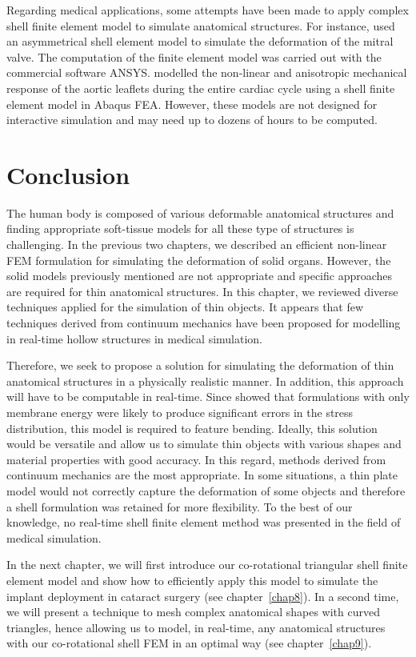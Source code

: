 Regarding medical applications, some attempts have been made to apply complex shell finite element model to simulate anatomical structures. For instance, \cite{Lim05} used an asymmetrical shell element model to simulate the deformation of the mitral valve. The computation of the finite element model was carried out with the commercial software ANSYS. \cite{Conti10} modelled the non-linear and anisotropic mechanical response of the aortic leaflets during the entire cardiac cycle using a shell finite element model in Abaqus FEA. However, these models are not designed for interactive simulation and may need up to dozens of hours to be computed. 


\section{Conclusion}

The human body is composed of various deformable anatomical structures and finding appropriate soft-tissue models for all these type of structures is challenging. In the previous two chapters, we described an efficient non-linear FEM formulation for simulating the deformation of solid organs. However, the solid models previously mentioned are not appropriate and specific approaches are required for thin anatomical structures. In this chapter, we reviewed diverse techniques applied for the simulation of thin objects. It appears that few techniques derived from continuum mechanics have been proposed for modelling in real-time hollow structures in medical simulation.

Therefore, we seek to propose a solution for simulating the deformation of thin anatomical structures in a physically realistic manner. In addition, this approach will have to be computable in real-time. Since \cite{Black91} showed that formulations with only membrane energy were likely to produce significant errors in the stress distribution, this model is required to feature bending. Ideally, this solution would be versatile and allow us to simulate thin objects with various shapes and material properties with good accuracy. In this regard, methods derived from continuum mechanics are the most appropriate. In some situations, a thin plate model would not correctly capture the deformation of some objects and therefore a shell formulation was retained for more flexibility. To the best of our knowledge, no real-time shell finite element method was presented in the field of medical simulation.

In the next chapter, we will first introduce our co-rotational triangular shell finite element model and show how to efficiently apply this model to simulate the implant deployment in cataract surgery (see chapter~\ref{chap8}). In a second time, we will present a technique to mesh complex anatomical shapes with curved triangles, hence allowing us to model, in real-time, any anatomical structures with our co-rotational shell FEM in an optimal way (see chapter~\ref{chap9}). 



